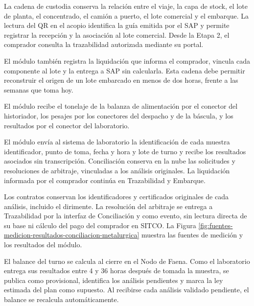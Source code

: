 \documentclass[subdoc]{../../comun/overfore}
\begin{document}
\begin{horizontal}
\end{horizontal}
La cadena de custodia conserva la relación entre el viaje, la capa de stock, el lote de planta, el concentrado, el camión a puerto, el lote comercial y el embarque. La lectura del QR en el acopio identifica la guía emitida por el SAP y permite registrar la recepción y la asociación al lote comercial. Desde la Etapa 2, el comprador consulta la trazabilidad autorizada mediante su portal.

El módulo también registra la liquidación que informa el comprador, vincula cada componente al lote y la entrega a SAP sin calcularla. Esta cadena debe permitir reconstruir el origen de un lote embarcado en menos de dos horas, frente a las semanas que toma hoy.

El módulo recibe el tonelaje de la balanza de alimentación por el conector del historiador, los pesajes por los conectores del despacho y de la báscula, y los resultados por el conector del laboratorio.

El módulo envía al sistema de laboratorio la identificación de cada muestra identificador, punto de toma, fecha y hora y lote de turno y recibe los resultados asociados sin transcripción. Conciliación conserva en la nube las solicitudes y resoluciones de arbitraje, vinculadas a los análisis originales. La liquidación informada por el comprador continúa en Trazabilidad y Embarque.

Los contratos conservan los identificadores y certificados originales de cada análisis, incluido el dirimente. La resolución del arbitraje se entrega a Trazabilidad por la interfaz de Conciliación y como evento, sin lectura directa de su base ni cálculo del pago del comprador en SITCO. La Figura \ref{fig:fuentes-medicion-resultados-conciliacion-metalurgica} muestra las fuentes de medición y los resultados del módulo.

\begin{horizontal}
\end{horizontal}
El balance del turno se calcula al cierre en el Nodo de Faena. Como el laboratorio entrega sus resultados entre 4 y 36 horas después de tomada la muestra, se publica como provisional, identifica los análisis pendientes y marca la ley estimada del plan como supuesto. Al recibirse cada análisis validado pendiente, el balance se recalcula automáticamente.
\end{document}
